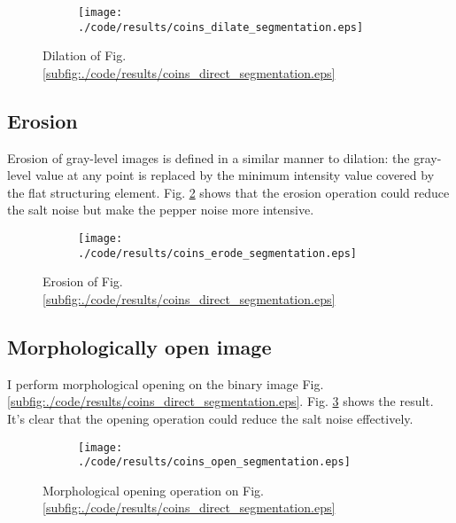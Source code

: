 \documentclass[journal,comsoc]{IEEEtran}
\begin{document}
\begin{figure}[!htb]
  \centering
  \begin{subfigure}[t]{.5\textwidth}
    \centering
    \texttt{[image: ./code/results/coins\_dilate\_segmentation.eps]}
  \end{subfigure}
  \caption{Dilation of Fig. \ref{subfig:./code/results/coins_direct_segmentation.eps}}
  \label{subfig:./code/results/coins_dilate_segmentation.eps}
\end{figure}

\subsection{Erosion}

Erosion of gray-level images is defined in a similar manner to dilation: the gray-level
value at any point is replaced by the minimum intensity value covered by the flat structuring element.
Fig. \ref{subfig:./code/results/coins_erode_segmentation.eps} shows that the erosion operation
could reduce the salt noise but make the pepper noise more intensive.

\begin{figure}[!htb]
  \centering
  \begin{subfigure}[t]{.5\textwidth}
    \centering
    \texttt{[image: ./code/results/coins\_erode\_segmentation.eps]}
  \end{subfigure}
  \caption{Erosion of Fig. \ref{subfig:./code/results/coins_direct_segmentation.eps}}
  \label{subfig:./code/results/coins_erode_segmentation.eps}
\end{figure}

\subsection{Morphologically open image}

I perform morphological opening on the binary image Fig. \ref{subfig:./code/results/coins_direct_segmentation.eps}.
Fig. \ref{subfig:./code/results/coins_open_segmentation.eps} shows the result. It's clear that
the opening operation could reduce the salt noise effectively.

\begin{figure}[!htb]
  \centering
  \begin{subfigure}[t]{.5\textwidth}
    \centering
    \texttt{[image: ./code/results/coins\_open\_segmentation.eps]}
  \end{subfigure}
  \caption{Morphological opening operation on Fig. \ref{subfig:./code/results/coins_direct_segmentation.eps}}
  \label{subfig:./code/results/coins_open_segmentation.eps}
\end{figure}
\end{document}
